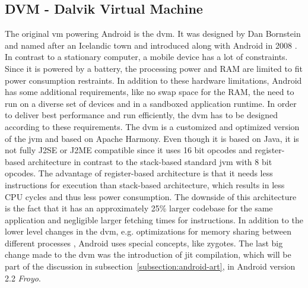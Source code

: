 \subsection{DVM - Dalvik Virtual Machine} \label{subsection:android-dalvik}
The original \gls{vm} powering Android is the \gls{dvm}.
It was designed by Dan Bornstein and named after an Icelandic town and introduced along with Android in 2008 \cite{developersRelease}.
\newline
In contrast to a stationary computer, a mobile device has a lot of constraints.
Since it is powered by a battery, the processing power and RAM are limited to fit power consumption restraints.
In addition to these hardware limitations, Android has some additional requirements, like no swap space for the RAM, the need to run on a diverse set of devices and in a sandboxed application runtime.
In order to deliver best performance and run efficiently, the \gls{dvm} has to be designed according to these requirements.
\newline
The \gls{dvm} is a customized and optimized version of the \gls{jvm} and based on Apache Harmony.
Even though it is based on Java, it is not fully J2SE or J2ME compatible since it uses 16 bit opcodes and register-based architecture in contrast to the stack-based standard \gls{jvm} with 8 bit opcodes.
The advantage of register-based architecture is that it needs less instructions for execution than stack-based architecture, which results in less CPU cycles and thus less power consumption.
The downside of this architecture is the fact that it has an approximately 25\% larger codebase for the same application and negligible larger fetching times for instructions.
In addition to the lower level changes in the \gls{dvm}, e.g. optimizations for memory sharing between different processes \cite{vecShare}, Android uses special concepts, like zygotes. \cite{ehringerDalvik} \cite{andevconDalvikART}
\newline
The last big change made to the \gls{dvm} was the introduction of \gls{jit} compilation, which will be part of the discussion in subsection~\ref{subsection:android-art}, in Android version 2.2 \textit{Froyo}.
